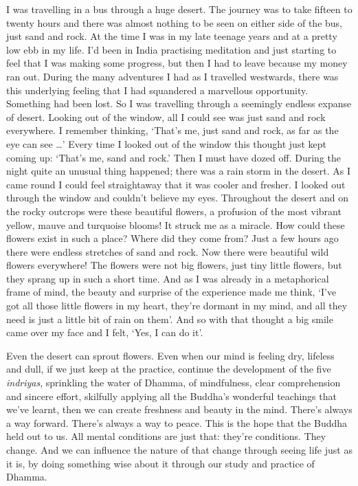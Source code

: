 I was travelling in a bus through a huge desert. The journey was to take
fifteen to twenty hours and there was almost nothing to be seen on
either side of the bus, just sand and rock. At the time I was in my late
teenage years and at a pretty low ebb in my life. I'd been in India
practising meditation and just starting to feel that I was making some
progress, but then I had to leave because my money ran out. During the
many adventures I had as I travelled westwards, there was this
underlying feeling that I had squandered a marvellous opportunity.
Something had been lost. So I was travelling through a seemingly endless
expanse of desert. Looking out of the window, all I could see was just
sand and rock everywhere. I remember thinking, `That's me, just sand and
rock, as far as the eye can see \ldots{}' Every time I looked out of the
window this thought just kept coming up: `That's me, sand and rock.'
Then I must have dozed off. During the night quite an unusual thing
happened; there was a rain storm in the desert. As I came round I could
feel straightaway that it was cooler and fresher. I looked out through
the window and couldn't believe my eyes. Throughout the desert and on
the rocky outcrops were these beautiful flowers, a profusion of the most
vibrant yellow, mauve and turquoise blooms! It struck me as a miracle.
How could these flowers exist in such a place? Where did they come from?
Just a few hours ago there were endless stretches of sand and rock. Now
there were beautiful wild flowers everywhere! The flowers were not big
flowers, just tiny little flowers, but they sprang up in such a short
time. And as I was already in a metaphorical frame of mind, the beauty
and surprise of the experience made me think, `I've got all those little
flowers in my heart, they're dormant in my mind, and all they need is
just a little bit of rain on them'. And so with that thought a big smile
came over my face and I felt, `Yes, I can do it'.

Even the desert can sprout flowers. Even when our mind is feeling dry,
lifeless and dull, if we just keep at the practice, continue the
development of the five \emph{indriyas}, sprinkling the water of Dhamma,
of mindfulness, clear comprehension and sincere effort, skilfully
applying all the Buddha's wonderful teachings that we've learnt, then we
can create freshness and beauty in the mind. There's always a way
forward. There's always a way to peace. This is the hope that the Buddha
held out to us. All mental conditions are just that: they're conditions.
They change. And we can influence the nature of that change through
seeing life just as it is, by doing something wise about it through our
study and practice of Dhamma.

